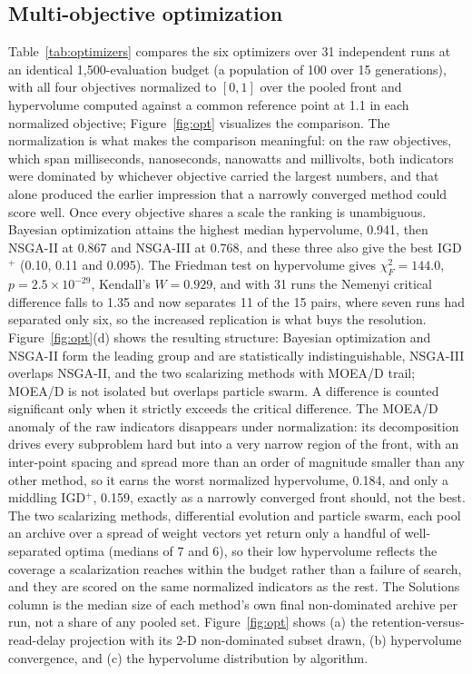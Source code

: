 \documentclass[11pt,a4paper]{article}
\begin{document}
\subsection{Multi-objective optimization}

Table~\ref{tab:optimizers} compares the six optimizers over 31 independent runs at
an identical 1{,}500-evaluation budget (a population of 100 over 15 generations),
with all four objectives normalized to $[0,1]$ over the pooled front and
hypervolume computed against a common reference point at 1.1 in each normalized
objective; Figure~\ref{fig:opt} visualizes the comparison. The normalization is what
makes the comparison meaningful: on the raw objectives, which span milliseconds,
nanoseconds, nanowatts and millivolts, both indicators were dominated by whichever
objective carried the largest numbers, and that alone produced the earlier
impression that a narrowly converged method could score well. Once every objective
shares a scale the ranking is unambiguous. Bayesian optimization attains the highest
median hypervolume, 0.941, then NSGA-II at 0.867 and NSGA-III at 0.768, and these
three also give the best IGD$^{+}$ (0.10, 0.11 and 0.095). The Friedman test on
hypervolume gives $\chi^2_F=144.0$, $p=2.5\times10^{-29}$, Kendall's $W=0.929$, and
with 31 runs the Nemenyi critical difference falls to 1.35 and now separates 11 of
the 15 pairs, where seven runs had separated only six, so the increased replication
is what buys the resolution. Figure~\ref{fig:opt}(d) shows the resulting structure:
Bayesian optimization and NSGA-II form the leading group and are statistically
indistinguishable, NSGA-III overlaps NSGA-II, and the two scalarizing methods with
MOEA/D trail; MOEA/D is not isolated but overlaps particle swarm. A difference is
counted significant only when it strictly exceeds the critical difference. The
MOEA/D anomaly of the raw indicators disappears under normalization: its
decomposition drives every subproblem hard but into a very narrow region of the
front, with an inter-point spacing and spread more than an order of magnitude
smaller than any other method, so it earns the worst normalized hypervolume, 0.184,
and only a middling IGD$^{+}$, 0.159, exactly as a narrowly converged front should,
not the best. The two scalarizing methods, differential evolution and particle
swarm, each pool an archive over a spread of weight vectors yet return only a
handful of well-separated optima (medians of 7 and 6), so their low hypervolume
reflects the coverage a scalarization reaches within the budget rather than a
failure of search, and they are scored on the same normalized indicators as the
rest. The Solutions column is the median size of each method's own final
non-dominated archive per run, not a share of any pooled set. Figure~\ref{fig:opt}
shows (a) the retention-versus-read-delay projection with its 2-D non-dominated
subset drawn, (b) hypervolume convergence, and (c) the hypervolume distribution by
algorithm.
\end{document}
